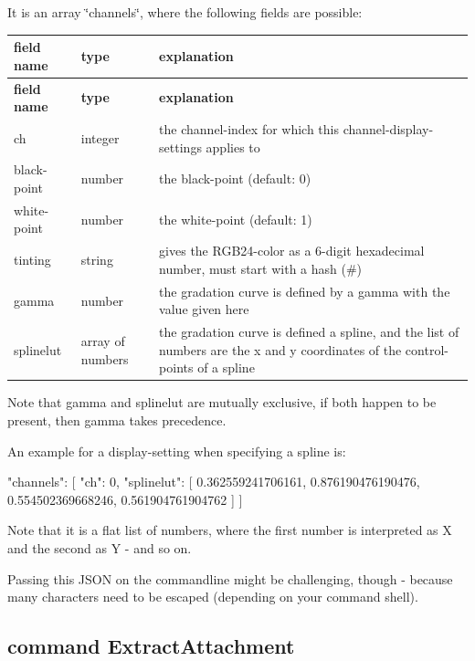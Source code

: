 It is an array \char`\"{}channels\char`\"{}, where the following fields are possible\+:

\tabulinesep=1mm
\begin{longtabu} spread 0pt [c]{*{3}{|X[-1]}|}
\hline
\rowcolor{\tableheadbgcolor}\textbf{ field name }&\textbf{ type }&\textbf{ explanation  }\\
\endfirsthead
\hline
\endfoot
\hline
\rowcolor{\tableheadbgcolor}\textbf{ field name }&\textbf{ type }&\textbf{ explanation  }\\
\endhead
ch &integer &the channel-\/index for which this channel-\/display-\/settings applies to \\
black-\/point &number &the black-\/point (default\+: 0) \\
white-\/point &number &the white-\/point (default\+: 1) \\
tinting &string &gives the R\+G\+B24-\/color as a 6-\/digit hexadecimal number, must start with a hash (\textquotesingle{}\#\textquotesingle{}) \\
gamma &number &the gradation curve is defined by a gamma with the value given here \\
splinelut &array of numbers &the gradation curve is defined a spline, and the list of numbers are the x and y coordinates of the control-\/points of a spline \\
\end{longtabu}
Note that \textquotesingle{}gamma\textquotesingle{} and \textquotesingle{}splinelut\textquotesingle{} are mutually exclusive, if both happen to be present, then \textquotesingle{}gamma\textquotesingle{} takes precedence.

An example for a display-\/setting when specifying a spline is\+: \begin{DoxyVerb}{
  "channels": [
    {
      "ch": 0,
      "splinelut": [
        0.362559241706161,  0.876190476190476,
        0.554502369668246,  0.561904761904762
      ]
    }
  ]
}
\end{DoxyVerb}


Note that it is a flat list of numbers, where the first number is interpreted as X and the second as Y -\/ and so on.

Passing this J\+S\+ON on the commandline might be challenging, though -\/ because many characters need to be escaped (depending on your command shell).

\subsection*{command \textquotesingle{}Extract\+Attachment\textquotesingle{}}

